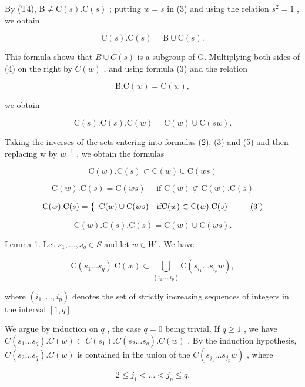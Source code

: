 By (T4), \(\mathrm{B} \neq \mathrm{C}(s). \mathrm{C}(s)\) ; putting \(w = s\) in (3) and using the relation \(s^2 = 1\) , we obtain

\[
\mathrm{C} (s). \mathrm{C} (s) = \mathrm{B} \cup \mathrm{C} (s).\tag{4}
\]

This formula shows that \(B \cup C(s)\) is a subgroup of G. Multiplying both sides of (4) on the right by \(C(w)\) , and using formula (3) and the relation

\[
\mathrm{B.C} (w) = \mathrm{C} (w),
\]

we obtain

\[
\mathrm{C} (s). \mathrm{C} (s). \mathrm{C} (w) = \mathrm{C} (w) \cup \mathrm{C} (s w).\tag{5}
\]

Taking the inverses of the sets entering into formulas (2), (3) and (5) and then replacing w by \(w^{-1}\) , we obtain the formulas

\[
\mathrm{C} (w). \mathrm{C} (s) \subset \mathrm{C} (w) \cup \mathrm{C} (w s)\tag{(2')}
\]

\[
\mathrm{C} (w). \mathrm{C} (s) = \mathrm{C} (w s) \quad \text {   if   } \mathrm{C} (w) \not \subset \mathrm{C} (w). \mathrm{C} (s)
\]

\[
\mathrm{C} (w). \mathrm{C} (s) = \left\{ \begin{array}{l l} \mathrm{C} (w) \cup \mathrm{C} (w s) & \text {if} \mathrm{C} (w) \subset \mathrm{C} (w). \mathrm{C} (s) \end{array} \right.\tag{3'}
\]

\[
\mathrm{C} (w). \mathrm{C} (s). \mathrm{C} (s) = \mathrm{C} (w) \cup \mathrm{C} (w s).\tag{(5')}
\]

Lemma 1. Let \(s_1, \ldots, s_q \in S\) and let \(w \in W\) . We have

\[
\mathrm{C} \left(s _ {1} \dots s _ {q}\right). \mathrm{C} (w) \subset \bigcup_ {\left(i _ {1}, \dots i _ {p}\right)} \mathrm{C} \left(s _ {i _ {1}} \dots s _ {i _ {p}} w\right),
\]

where \((i_1, \ldots, i_p)\) denotes the set of strictly increasing sequences of integers in the interval \([1, q]\) .

We argue by induction on \(q\) , the case \(q = 0\) being trivial. If \(q \geqslant 1\) , we have \(C(s_1 \ldots s_q).C(w) \subset C(s_1).C(s_2 \ldots s_q).C(w)\) . By the induction hypothesis, \(C(s_2 \ldots s_q).C(w)\) is contained in the union of the \(C(s_{j_1} \ldots s_{j_p}w)\) , where

\[
2 \leqslant j _ {1} <   \dots <   j _ {p} \leqslant q.
\]

